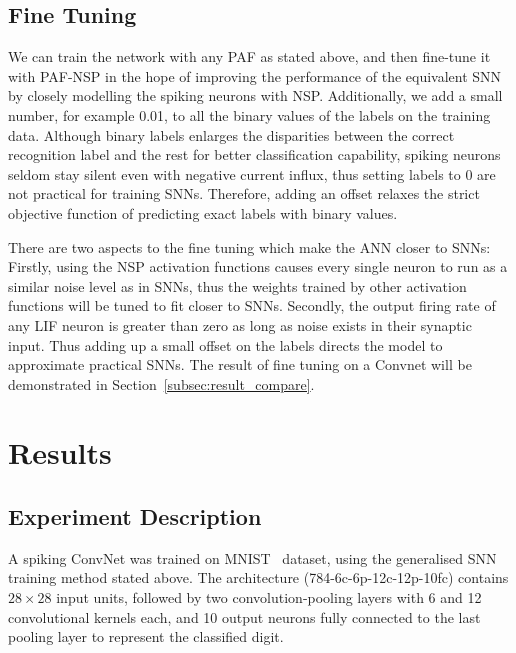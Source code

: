 \documentclass[10pt,journal,compsoc]{IEEEtran}
\begin{document}
	\subsection{Fine Tuning}
	We can train the network with any PAF as stated above, and then fine-tune it with PAF-NSP in the hope of improving the performance of the equivalent SNN by closely modelling the spiking neurons with NSP.
	Additionally, we add a small number, for example 0.01, to all the binary values of the labels on the training data.
	Although binary labels enlarges the disparities between the correct recognition label and the rest for better classification capability, 
	spiking neurons seldom stay silent even with negative current influx, thus setting labels to 0 are not practical for training SNNs.
	Therefore, adding an offset relaxes the strict objective function of predicting exact labels with binary values.

	
	There are two aspects to the fine tuning which make the ANN closer to SNNs:
	Firstly, using the NSP activation functions causes every single neuron to run as a similar noise level as in SNNs, thus the weights trained by other activation functions will be tuned to fit closer to SNNs.
	Secondly, the output firing rate of any LIF neuron is greater than zero as long as noise exists in their synaptic input.
	Thus adding up a small offset on the labels directs the model to approximate practical SNNs. 
	The result of fine tuning on a Convnet will be demonstrated in Section~\ref{subsec:result_compare}.
	
	\section{Results}
	\label{sec:result}
	
	\subsection{Experiment Description}
	A spiking ConvNet was trained on MNIST~\cite{lecun1998gradient} dataset, 
	using the generalised SNN training method stated above.
	The architecture (784-6c-6p-12c-12p-10fc) contains $28\times28$ input units, followed by two convolution-pooling layers with 6 and 12 convolutional kernels each, and 10 output neurons fully connected to the last pooling layer to represent the classified digit.
	
\end{document}

